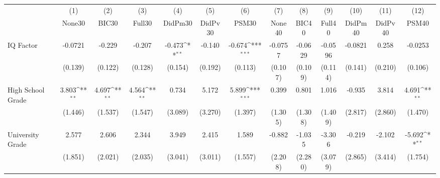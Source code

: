 {
\def\sym#1{\ifmmode^{#1}\else\(^{#1}\)\fi}
\begin{tabular}{l*{12}{c}}
\toprule
            &\multicolumn{1}{c}{(1)}&\multicolumn{1}{c}{(2)}&\multicolumn{1}{c}{(3)}&\multicolumn{1}{c}{(4)}&\multicolumn{1}{c}{(5)}&\multicolumn{1}{c}{(6)}&\multicolumn{1}{c}{(7)}&\multicolumn{1}{c}{(8)}&\multicolumn{1}{c}{(9)}&\multicolumn{1}{c}{(10)}&\multicolumn{1}{c}{(11)}&\multicolumn{1}{c}{(12)}\\
            &\multicolumn{1}{c}{None30}&\multicolumn{1}{c}{BIC30}&\multicolumn{1}{c}{Full30}&\multicolumn{1}{c}{DidPm30}&\multicolumn{1}{c}{DidPv30}&\multicolumn{1}{c}{PSM30}&\multicolumn{1}{c}{None40}&\multicolumn{1}{c}{BIC40}&\multicolumn{1}{c}{Full40}&\multicolumn{1}{c}{DidPm40}&\multicolumn{1}{c}{DidPv40}&\multicolumn{1}{c}{PSM40}\\
\midrule
IQ Factor   &     -0.0721         &      -0.229         &      -0.207         &      -0.473\sym{**} &      -0.140         &      -0.674\sym{***}&     -0.0757         &     -0.0629         &     -0.0596         &     -0.0821         &       0.258         &     -0.0253         \\
            &     (0.139)         &     (0.122)         &     (0.128)         &     (0.154)         &     (0.192)         &     (0.113)         &     (0.107)         &     (0.109)         &     (0.114)         &     (0.141)         &     (0.210)         &     (0.106)         \\
\addlinespace
High School Grade&       3.803\sym{**} &       4.697\sym{**} &       4.564\sym{**} &       0.734         &       5.172         &       5.899\sym{***}&       0.399         &       0.801         &       1.016         &      -0.935         &       3.814         &       4.691\sym{**} \\
            &     (1.446)         &     (1.537)         &     (1.547)         &     (3.089)         &     (3.270)         &     (1.397)         &     (1.305)         &     (1.308)         &     (1.409)         &     (2.817)         &     (2.860)         &     (1.470)         \\
\addlinespace
University Grade&       2.577         &       2.606         &       2.344         &       3.949         &       2.415         &       1.589         &      -0.882         &      -1.035         &      -3.306         &      -0.219         &      -2.102         &      -5.692\sym{**} \\
            &     (1.851)         &     (2.021)         &     (2.035)         &     (3.041)         &     (3.011)         &     (1.557)         &     (2.208)         &     (2.280)         &     (3.079)         &     (2.865)         &     (3.414)         &     (1.754)         \\

\end{tabular}}
